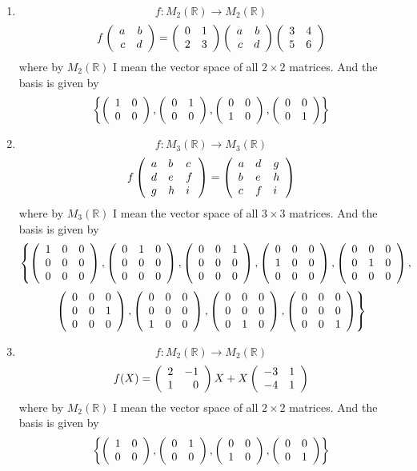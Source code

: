 \documentclass[12pt]{article} %
\begin{document}
\begin{enumerate}
\item \[f:M_2(\mathbb{R})\to M_2(\mathbb{R})\]
	\[f\left(\begin{array}{rr}a&b\\c&d\end{array}\right)=\left(\begin{array}{rr}0&1\\2&3\end{array}\right)\left(\begin{array}{rr}a&b\\c&d\end{array}\right)\left(\begin{array}{rr}3&4\\5&6\end{array}\right)\]
	where by $M_2(\mathbb{R})$ I mean the vector space of all $2\times2$ matrices. And the basis is given by
	\[\left\{\left(\begin{array}{rr}1&0\\0&0\end{array}\right),\left(\begin{array}{rr}0&1\\0&0\end{array}\right),\left(\begin{array}{rr}0&0\\1&0\end{array}\right),\left(\begin{array}{rr}0&0\\0&1\end{array}\right)\right\}\]
\item \[f:M_3(\mathbb{R})\to M_3(\mathbb{R})\]%
	\[f\left(\begin{array}{lll}a&b&c\\d&e&f\\g&h&i\end{array}\right)=\left(\begin{array}{lll}a&d&g\\b&e&h\\c&f&i\end{array}\right)\]
	where by $M_3(\mathbb{R})$ I mean the vector space of all $3\times3$ matrices. And the basis is given by
	\[\left\{
	\left(\begin{array}{lll}1&0&0\\0&0&0\\0&0&0\end{array}\right),
	\left(\begin{array}{lll}0&1&0\\0&0&0\\0&0&0\end{array}\right),
	\left(\begin{array}{lll}0&0&1\\0&0&0\\0&0&0\end{array}\right),
	\left(\begin{array}{lll}0&0&0\\1&0&0\\0&0&0\end{array}\right),
	\left(\begin{array}{lll}0&0&0\\0&1&0\\0&0&0\end{array}\right),\right.\]\[\left.
	\left(\begin{array}{lll}0&0&0\\0&0&1\\0&0&0\end{array}\right),
	\left(\begin{array}{lll}0&0&0\\0&0&0\\1&0&0\end{array}\right),
	\left(\begin{array}{lll}0&0&0\\0&0&0\\0&1&0\end{array}\right),
	\left(\begin{array}{lll}0&0&0\\0&0&0\\0&0&1\end{array}\right)
	\right\}\]
\item \[f:M_2(\mathbb{R})\to M_2(\mathbb{R})\]%
	\[f(X)=\left(\begin{array}{rr}2&-1\\1&0\end{array}\right)X+X\left(\begin{array}{rr}-3&1\\-4&1\end{array}\right)\]
	where by $M_2(\mathbb{R})$ I mean the vector space of all $2\times2$ matrices. And the basis is given by
	\[\left\{\left(\begin{array}{rr}1&0\\0&0\end{array}\right),\left(\begin{array}{rr}0&1\\0&0\end{array}\right),\left(\begin{array}{rr}0&0\\1&0\end{array}\right),\left(\begin{array}{rr}0&0\\0&1\end{array}\right)\right\}\]
\end{enumerate}
\end{document}
